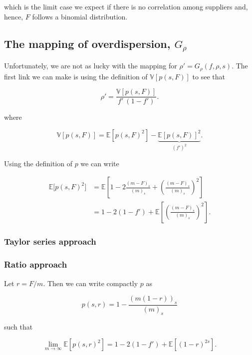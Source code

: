 \documentclass[american, abstract=on]{scrartcl}
\newcommand{\E}{\mathbb{E}}
\newcommand{\V}{\mathbb{V}}
\begin{document}
which is the limit case we expect if there is no correlation among suppliers and, hence, $F$ follows a binomial distribution.

\subsection{The mapping of overdispersion, $G_\rho$}

Unfortunately, we are not as lucky with the mapping for $\rho' = G_{\rho}(f, \rho, s)$. The first link we can make is using the definition of $\V[p(s, F)]$ to see that

\begin{equation}
    \rho' = \frac{\V[p(s, F)]}{f' \ (1 - f')}.
\end{equation}

where

\begin{equation}
    \V[p(s, F)] = \E[p(s, F)^2] - \underbrace{\E[p(s, F)]^2}_{\left(f'\right)^2}.
\end{equation}

Using the definition of $p$ we can write

\begin{equation}
    \begin{split}
        \E\big[ p(s, F)^2 \big] &= \E\left[1 - 2 \frac{(m - F)_s}{(m)_s} + \left(\frac{(m - F)_s}{(m)_s}  \right)^2\right] \\
        &= 1 - 2(1 - f') + \E\left[ \left(\frac{(m - F)_s}{(m)_s}  \right)^2 \right].
    \end{split}
\end{equation}

\subsubsection{Taylor series approach}

\subsubsection{Ratio approach}

Let $r = F / m$. Then we can write compactly $p$ as

\begin{equation}
    p(s, r) = 1 - \frac{(m(1- r))_s}{(m)_s}
\end{equation}

such that

\begin{equation}
   \lim_{m \rightarrow \infty} \E \left[p(s, r)^2\right] = 1 - 2(1 - f') + \E\left[(1 - r)^{2s}\right].
\end{equation}
\end{document}
